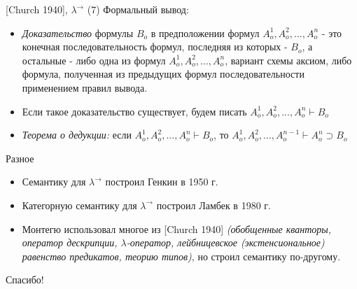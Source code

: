 \documentclass{beamer}
\begin{document}
\begin{frame}{[Church 1940], $\lambda^\to$ (7)}
Формальный вывод:\\
\bigskip
\begin{itemize}
  \item \textit{Доказательство} формулы $B_o$ в предположении формул $A_o^1, A_o^2, ..., A_o^n$ - это конечная последовательность формул, последняя из которых - $B_o$, а остальные - либо одна из формул $A_o^1, A_o^2, ..., A_o^n$, вариант схемы аксиом, либо формула, полученная из предыдущих формул последовательности применением правил вывода.
  \item Если такое доказательство существует, будем писать $A_o^1, A_o^2, ..., A_o^n \vdash B_o$
  \item \textit{Теорема о дедукции:} если $A_o^1, A_o^2, ..., A_o^n \vdash B_o$, то $A_o^1, A_o^2, ..., A_o^{n-1} \vdash A_o^n \supset B_o$
\end{itemize}
\end{frame}

\begin{frame}{Разное}
\begin{itemize}
  \item Семантику для $\lambda^\to$ построил Генкин в 1950 г.
  \item Категорную семантику для $\lambda^\to$ построил Ламбек в 1980 г.
  \item Монтегю использовал многое из [Church 1940] \textit{(обобщенные кванторы, оператор дескрипции, $\lambda$-оператор, лейбницевское (экстенсиональное) равенство предикатов, теорию типов)}, но строил семантику по-другому.
\end{itemize}
\end{frame}

\begin{frame}{}
    \thispagestyle{empty}
    \begin{center}
        {\large Спасибо!}
    \end{center}
\end{frame}


\end{document}
